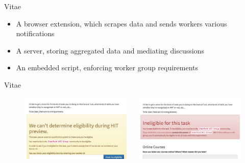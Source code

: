 \documentclass[presentation]{subfiles}
\begin{document}
\begin{frame}{Vitae}
  \begin{itemize}
    \item<+-> A browser extension, which scrapes data and sends workers various notifications
    \item<+-> A server, storing aggregated data and mediating discussions
    \item<+-> An embedded script, enforcing worker group requirements
  \end{itemize}
\end{frame}

\begin{frame}{Vitae}
\begin{figure}
  \begin{columns}
  \begin{column}{0.45\textwidth}
  \includegraphics[width=\textwidth]{../common_figures/unknown.png}
  \end{column}
  \begin{column}{0.45\textwidth}
  \includegraphics[width=\textwidth]{../common_figures/ineligible.png}


\end{column}
\end{columns}
\end{figure}
\end{frame}
\end{document}
